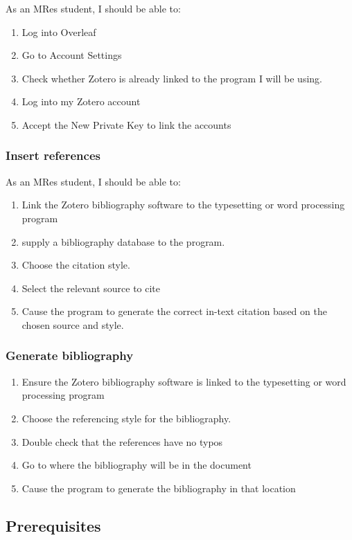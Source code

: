 \documentclass{article}
\begin{document}
As an MRes student, I should be able to: 
\begin{enumerate} 
\item Log into Overleaf
\item Go to Account Settings
\item Check whether Zotero is already linked to the program I will be using.
\item Log into my Zotero account
\item Accept the New Private Key to link the accounts
\end{enumerate} 

\subsubsection*{Insert references}

As an MRes student, I should be able to: 
\begin{enumerate} 
\item Link the Zotero bibliography software to the typesetting or word processing program
\item supply a bibliography database to the program. 
\item Choose the citation style.
\item Select the relevant source to cite
\item Cause the program to generate the correct in-text citation based on the chosen source and style.
\end{enumerate} 

\subsubsection*{Generate bibliography}
\begin{enumerate} 
\item Ensure the Zotero bibliography software is linked to the typesetting or word processing program
\item Choose the referencing style for the bibliography.
\item Double check that the references have no typos
\item Go to where the bibliography will be in the document
\item Cause the program to generate the bibliography in that location
\end{enumerate} 


\subsection*{Prerequisites}
\end{document}
